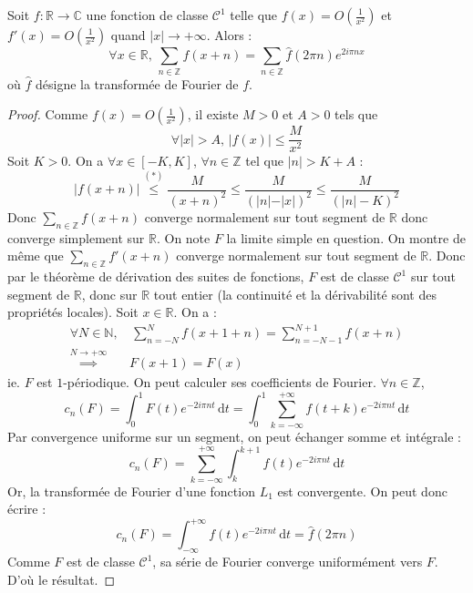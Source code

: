 






  \begin{theorem}
    \label{formule-sommatoire-de-poisson-1}
    Soit $f : \mathbb{R} \rightarrow \mathbb{C}$ une fonction de classe $\mathcal{C}^1$ telle que $f(x) = O \left( \frac{1}{x^2} \right)$ et $f'(x) = O \left( \frac{1}{x^2} \right)$ quand $|x| \longrightarrow +\infty$. Alors :
    \[ \forall x \in \mathbb{R}, \, \sum_{n \in \mathbb{Z}} f(x+n) = \sum_{n \in \mathbb{Z}} \widehat{f}(2 \pi n) e^{2 i \pi n x} \]
    où $\widehat{f}$ désigne la transformée de Fourier de $f$.
  \end{theorem}

  \begin{proof}
    Comme $f(x) = O \left( \frac{1}{x^2} \right)$, il existe $M > 0$ et $A > 0$ tels que
    \[ \forall |x| > A, \, |f(x)| \leq \frac{M}{x^2} \tag{$*$} \]
    Soit $K > 0$. On a $\forall x \in [-K, K]$, $\forall n \in \mathbb{Z}$ tel que $|n| > K + A$ :
    \[ |f(x+n)| \overset{(*)}{\leq} \frac{M}{(x+n)^2} \leq \frac{M}{(\vert n \vert - \vert x \vert)^2} \leq \frac{M}{(|n| - K)^2} \]
    Donc $\sum_{n \in \mathbb{Z}} f(x+n)$ converge normalement sur tout segment de $\mathbb{R}$ donc converge simplement sur $\mathbb{R}$. On note $F$ la limite simple en question.
    \newpar
    On montre de même que $\sum_{n \in \mathbb{Z}} f'(x+n)$ converge normalement sur tout segment de $\mathbb{R}$. Donc par le théorème de dérivation des suites de fonctions, $F$ est de classe $\mathcal{C}^1$ sur tout segment de $\mathbb{R}$, donc sur $\mathbb{R}$ tout entier (la continuité et la dérivabilité sont des propriétés locales).
    \newpar
    Soit $x \in \mathbb{R}$. On a :
    \begin{align*}
      \forall N \in \mathbb{N}, &\, \sum_{n=-N}^N f(x+1+n) = \sum_{n=-N-1}^{N+1} f(x+n) \\
      \overset{N \longrightarrow +\infty}{\implies} & F(x+1) = F(x)
    \end{align*}
    ie. $F$ est $1$-périodique. On peut calculer ses coefficients de Fourier. $\forall n \in \mathbb{Z}$,
    \[ c_n(F) = \int_0^1 F(t) e^{-2i\pi n t} \, \mathrm{d}t = \int_0^1 \sum_{k=-\infty}^{+\infty} f(t+k) e^{-2i\pi n t} \, \mathrm{d}t \]
    Par convergence uniforme sur un segment, on peut échanger somme et intégrale :
    \[ c_n(F) = \sum_{k=-\infty}^{+\infty} \int_k^{k+1} f(t) e^{-2i\pi n t} \, \mathrm{d}t \]
    Or, la transformée de Fourier d'une fonction $L_1$ est convergente. On peut donc écrire :
    \[ c_n(F) = \int_{-\infty}^{+\infty} f(t) e^{-2i\pi n t} \, \mathrm{d}t = \widehat{f}(2\pi n) \]
    Comme $F$ est de classe $\mathcal{C}^1$, sa série de Fourier converge uniformément vers $F$. D'où le résultat.
  \end{proof}

